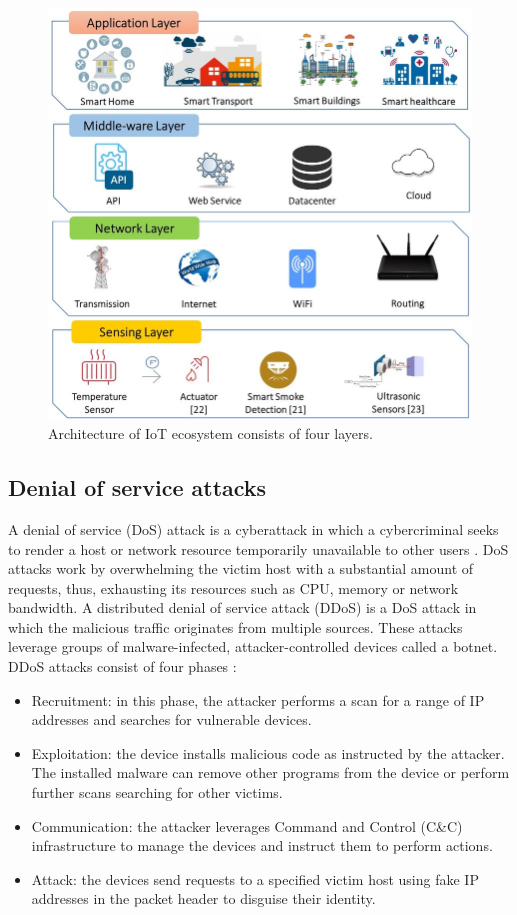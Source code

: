 \documentclass[conference, 11pt]{IEEEtran}
\begin{document}
    \begin{figure}[htbp]
        \centerline{\includegraphics[width=\linewidth]{figures/iot-architecture.jpg}}
        \caption{Architecture of IoT ecosystem consists of four layers. \cite{article:9}}
        \label{fig:iota}
    \end{figure}

    \subsection{Denial of service attacks}
    A denial of service (DoS) attack is a cyberattack in which a cybercriminal seeks to render a host or network resource temporarily unavailable to other users \cite{article:8}.
    DoS attacks work by overwhelming the victim host with a substantial amount of requests, thus, exhausting its resources such as CPU, memory or network bandwidth.
    A distributed denial of service attack (DDoS) is a DoS attack in which the malicious traffic originates from multiple sources.
    These attacks leverage groups of malware-infected, attacker-controlled devices called a botnet.
    DDoS attacks consist of four phases \cite{article:8}:
    \begin{itemize}
        \item Recruitment: in this phase, the attacker performs a scan for a range of IP addresses and searches for vulnerable devices.
        \item Exploitation: the device installs malicious code as instructed by the attacker.
        The installed malware can remove other programs from the device or perform further scans searching for other victims.
        \item Communication: the attacker leverages Command and Control (C\&C) infrastructure to manage the devices and instruct them to perform actions.
        \item Attack: the devices send requests to a specified victim host using fake IP addresses in the packet header to disguise their identity.
    \end{itemize}
\end{document}
